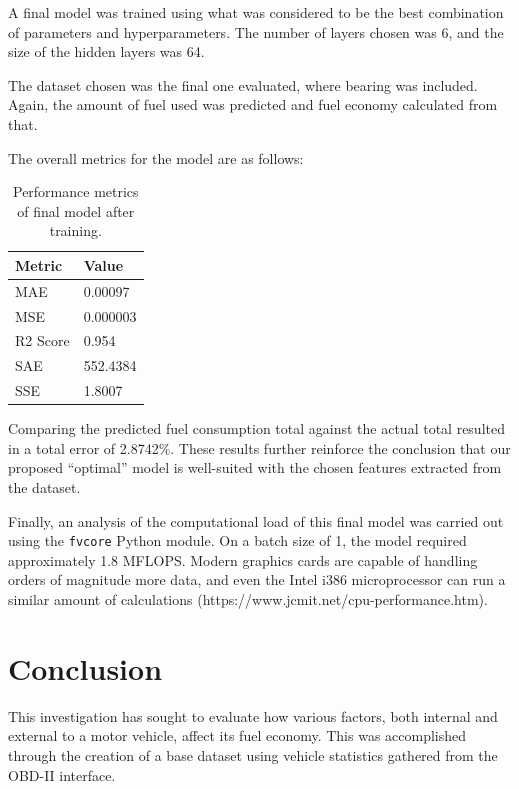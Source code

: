 \documentclass[letterpaper]{article}
\begin{document}
A final model was trained using what was considered to be the best 
combination of parameters and hyperparameters. The number of layers chosen 
was 6, and the size of the hidden layers was 64.

The dataset chosen was the final one evaluated, where bearing was 
included. Again, the amount of fuel used was predicted and fuel economy 
calculated from that.

The overall metrics for the model are as follows:

\begin{table}[h!]
    \begin{tabular}{|l|l|}
        \hline
        Metric & Value \\
        \hline
        MAE          	& 0.00097	\\
        MSE          	& 0.000003   \\
        R2 Score     	& 0.954  	\\
        SAE          	& 552.4384   \\
        SSE          	& 1.8007 \\
        \hline
    \end{tabular}
    \caption{Performance metrics of final model after training.}
    \label{tab:my-table}
\end{table}

Comparing the predicted fuel consumption total against the actual total 
resulted in a total error of 2.8742\%. These results further reinforce the 
conclusion that our proposed ``optimal'' model is well-suited with the 
chosen features extracted from the dataset.

Finally, an analysis of the computational load of this final model was 
carried out using the \verb|fvcore| Python module. On a batch size of 1, 
the model required approximately 1.8 MFLOPS. Modern graphics cards are 
capable of handling orders of magnitude more data, and even the Intel 
i386 microprocessor can run a similar amount of calculations 
(https://www.jcmit.net/cpu-performance.htm).

\section{Conclusion}

This investigation has sought to evaluate how various factors, both 
internal and external to a motor vehicle, affect its fuel economy. This 
was accomplished through the creation of a base dataset using vehicle 
statistics gathered from the OBD-II interface.
\end{document}
